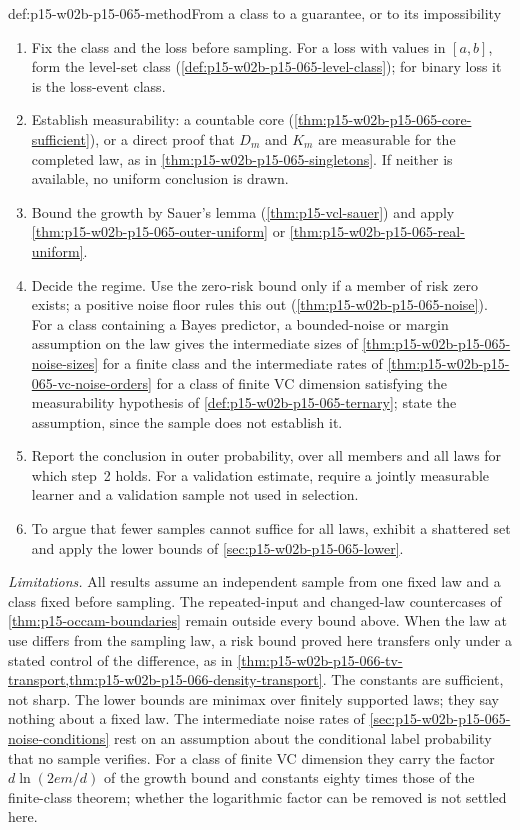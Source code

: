\begin{hbmethod}{def:p15-w02b-p15-065-method}{From a class to a guarantee, or to its impossibility}
\begin{enumerate}
\item Fix the class and the loss before sampling. For a loss with values in
      \([a,b]\), form the level-set class
      (\cref{def:p15-w02b-p15-065-level-class}); for binary loss it is the
      loss-event class.
\item Establish measurability: a countable core
      (\cref{thm:p15-w02b-p15-065-core-sufficient}), or a direct proof
      that \(D_m\) and \(K_m\) are measurable for the completed law, as in
      \cref{thm:p15-w02b-p15-065-singletons}. If neither is available, no
      uniform conclusion is drawn.
\item Bound the growth by Sauer's lemma (\cref{thm:p15-vcl-sauer}) and
      apply \cref{thm:p15-w02b-p15-065-outer-uniform} or
      \cref{thm:p15-w02b-p15-065-real-uniform}.
\item Decide the regime. Use the zero-risk bound only if a member of risk
      zero exists; a positive noise floor rules this out
      (\cref{thm:p15-w02b-p15-065-noise}). For a class containing a
      Bayes predictor, a bounded-noise or margin assumption on the law
      gives the intermediate sizes of
      \cref{thm:p15-w02b-p15-065-noise-sizes} for a finite class and the
      intermediate rates of \cref{thm:p15-w02b-p15-065-vc-noise-orders}
      for a class of finite VC dimension satisfying the measurability
      hypothesis of \cref{def:p15-w02b-p15-065-ternary}; state the
      assumption, since the sample does not establish it.
\item Report the conclusion in outer probability, over all members and all
      laws for which step~2 holds. For a validation estimate, require a
      jointly measurable learner and a validation sample not used in
      selection.
\item To argue that fewer samples cannot suffice for all laws, exhibit a
      shattered set and apply the lower bounds of
      \cref{sec:p15-w02b-p15-065-lower}.
\end{enumerate}
\end{hbmethod}

\emph{Limitations.} All results assume an independent sample from one fixed
law and a class fixed before sampling. The repeated-input and changed-law
countercases of \cref{thm:p15-occam-boundaries} remain outside every bound
above. When the law at use differs from the sampling law, a risk bound
proved here transfers only under a stated control of the difference, as in
\cref{thm:p15-w02b-p15-066-tv-transport,thm:p15-w02b-p15-066-density-transport}.
The constants are sufficient, not sharp. The lower bounds are
minimax over finitely supported laws; they say nothing about a fixed law.
The intermediate noise rates of
\cref{sec:p15-w02b-p15-065-noise-conditions} rest on an assumption about
the conditional label probability that no sample verifies. For a class of
finite VC dimension they carry the factor \(d\ln(2em/d)\) of the growth
bound and constants eighty times those of the finite-class theorem; whether the logarithmic factor can be removed is not settled
here.

